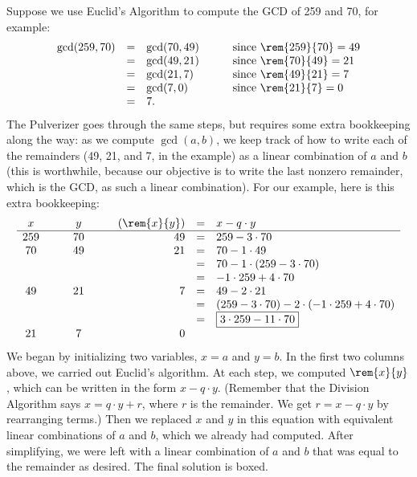 Suppose we use Euclid's Algorithm to compute the GCD of 259 and 70, for
example:
\[
\begin{array}{rclcl}
\gcd(259, 70)
    & = & \gcd(70, 49) & \quad & \text{since $\rem{259}{70} = 49$}\\
    & = & \gcd(49, 21) && \text{since $\rem{70}{49} = 21$} \\
    & = & \gcd(21, 7) && \text{since $\rem{49}{21} = 7$} \\
    & = & \gcd(7, 0) && \text{since $\rem{21}{7} = 0$} \\
    & = & 7.
\end{array}
\]
The Pulverizer goes through the same steps, but requires some extra
bookkeeping along the way: as we compute $\gcd(a, b)$, we keep track
of how to write each of the remainders (49, 21, and 7, in the example)
as a linear combination of $a$ and $b$ (this is worthwhile, because
our objective is to write the last nonzero remainder, which is the
GCD, as such a linear combination).  For our example, here is this
extra bookkeeping:
\[
\begin{array}{ccccrcl}
x & \quad & y & \quad & (\rem{x}{y}) & = & x - q \cdot y \\ \hline
259 && 70 && 49 & = &   259 - 3 \cdot 70 \\
70 && 49 && 21  & = &   70 - 1 \cdot 49 \\
&&&&            & = &   70 - 1 \cdot (259 - 3 \cdot 70) \\
&&&&            & = &   -1 \cdot 259 + 4 \cdot 70 \\
49 && 21 && 7   & = &   49 - 2 \cdot 21 \\
&&&&            & = &   (259 - 3 \cdot 70) -
                                2 \cdot (-1 \cdot 259 + 4 \cdot 70) \\
&&&&            & = &   \fbox{$3 \cdot 259 - 11 \cdot 70$} \\
21 && 7 && 0
\end{array}
\]
We began by initializing two variables, $x = a$ and $y = b$.  In the
first two columns above, we carried out Euclid's algorithm.  At each
step, we computed $\rem{x}{y}$, which can be written in the form $x - q
\cdot y$.  (Remember that the Division Algorithm says $x = q \cdot y +
r$, where $r$ is the remainder.  We get $r = x - q \cdot y$ by
rearranging terms.)  Then we replaced $x$ and $y$ in this equation
with equivalent linear combinations of $a$ and $b$, which we already
had computed.  After simplifying, we were left with a linear
combination of $a$ and $b$ that was equal to the remainder as desired.
The final solution is boxed.

